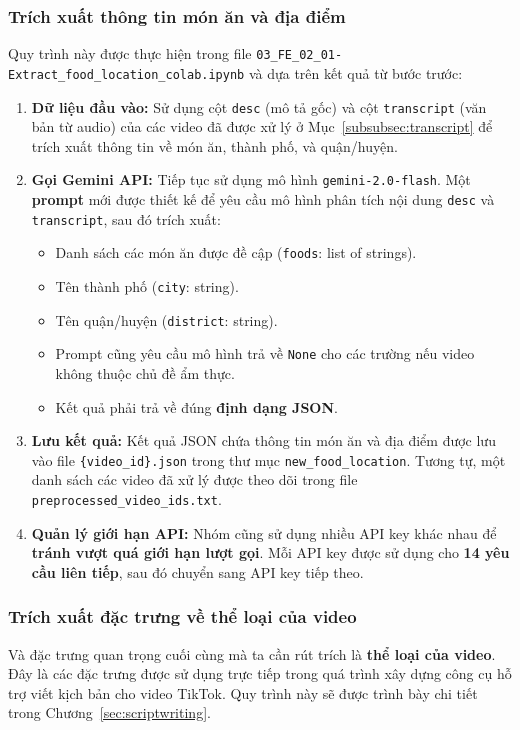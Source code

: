 \subsubsection{Trích xuất thông tin món ăn và địa điểm}

\noindent
Quy trình này được thực hiện trong file \texttt{03\_FE\_02\_01-Extract\_food\_location\_colab.ipynb} và dựa trên kết quả từ bước trước:
\begin{enumerate}
    \item \textbf{Dữ liệu đầu vào:} Sử dụng cột \texttt{desc} (mô tả gốc) và cột \texttt{transcript} (văn bản từ audio) của các video đã được xử lý ở Mục~\ref{subsubsec:transcript} để trích xuất thông tin về món ăn, thành phố, và quận/huyện.
    
    \item \textbf{Gọi Gemini API:} Tiếp tục sử dụng mô hình \texttt{gemini-2.0-flash}. Một \textbf{prompt} mới được thiết kế để yêu cầu mô hình phân tích nội dung \texttt{desc} và \texttt{transcript}, sau đó trích xuất:
    \begin{itemize}
        \item Danh sách các món ăn được đề cập (\texttt{foods}: list of strings).

        \item Tên thành phố (\texttt{city}: string).
        
        \item Tên quận/huyện (\texttt{district}: string).
        
        \item Prompt cũng yêu cầu mô hình trả về \texttt{None} cho các trường nếu video không thuộc chủ đề ẩm thực.
        
        \item Kết quả phải trả về đúng \textbf{định dạng JSON}.
    \end{itemize}

    \item \textbf{Lưu kết quả:} Kết quả JSON chứa thông tin món ăn và địa điểm được lưu vào file \texttt{\{video\_id\}.json} trong thư mục \texttt{new\_food\_location}. Tương tự, một danh sách các video đã xử lý được theo dõi trong file \texttt{preprocessed\_video\_ids.txt}.
    
    \item \textbf{Quản lý giới hạn API:} Nhóm cũng sử dụng nhiều API key khác nhau để \textbf{tránh vượt quá giới hạn lượt gọi}. Mỗi API key được sử dụng cho \textbf{14 yêu cầu liên tiếp}, sau đó chuyển sang API key tiếp theo.
\end{enumerate}

\subsubsection{Trích xuất đặc trưng về thể loại của video}

Và đặc trưng quan trọng cuối cùng mà ta cần rút trích là \textbf{thể loại của video}. Đây là các đặc trưng được sử dụng trực tiếp trong quá trình xây dựng công cụ hỗ trợ viết kịch bản cho video TikTok. Quy trình này sẽ được trình bày chi tiết trong Chương~\ref{sec:scriptwriting}.

